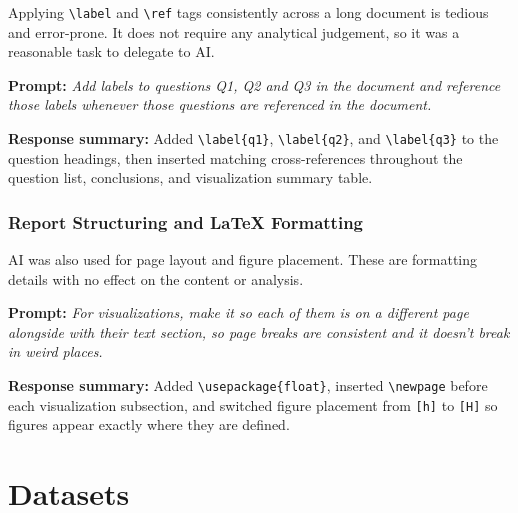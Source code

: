 \documentclass[a4paper,11pt]{article}
\renewenvironment{quote}
  {\begin{mdframed}[style=promptbox]\small}
  {\end{mdframed}}
\begin{document}
\par
Applying \texttt{\textbackslash label} and \texttt{\textbackslash ref} tags
consistently across a long document is tedious and error-prone. It does not
require any analytical judgement, so it was a reasonable task to delegate to AI.

\begin{quote}
	\textbf{Prompt:} \textit{Add labels to questions Q1, Q2 and Q3 in the document
		and reference those labels whenever those questions are referenced in the
		document.}
\end{quote}

\begin{quote}
	\textbf{Response summary:} Added \texttt{\textbackslash label\{q1\}},
	\texttt{\textbackslash label\{q2\}}, and \texttt{\textbackslash label\{q3\}}
	to the question headings, then inserted matching cross-references throughout
	the question list, conclusions, and visualization summary table.
\end{quote}

\subsubsection{Report Structuring and LaTeX Formatting}\label{sec:ai:latex}

\par
AI was also used for page layout and figure placement. These are formatting
details with no effect on the content or analysis.

\begin{quote}
	\textbf{Prompt:} \textit{For visualizations, make it so each of them is on a
		different page alongside with their text section, so page breaks are consistent
		and it doesn't break in weird places.}
\end{quote}

\begin{quote}
	\textbf{Response summary:} Added \texttt{\textbackslash usepackage\{float\}},
	inserted \texttt{\textbackslash newpage} before each visualization subsection,
	and switched figure placement from \texttt{[h]} to \texttt{[H]} so figures
	appear exactly where they are defined.
\end{quote}

\section{Datasets}\label{sec:datasets}
\end{document}
